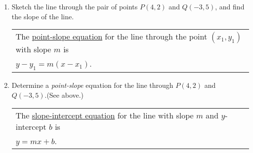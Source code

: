 \begin{enumerate}
\item Sketch the line through the pair of points $P(4,2)$ and $Q(-3,5
)$, and find the slope of the line. 


\hspace{-.3in} \begin{tabular}{| l |}\hline
 \noindent The \underline{point-slope equation} for the line through the point $(x_1,y_1)$ with slope $m$ is \\

 $y-y_1 = m(x-x_1)$. \\ \hline
\end{tabular} 

\vspace{-.1in}
\item Determine a \emph{point-slope} equation for the line through $P(4,2)$ and $Q(-3,5)$.(See above.)\\[1in]






\hspace{-.3in} \begin{tabular}{| l |}\hline The \underline{slope-intercept equation} for the line with slope $m$ and $y$-intercept $b$ is \\

 $y = mx +b$. \\ \hline
\end{tabular} 




\end{enumerate}
